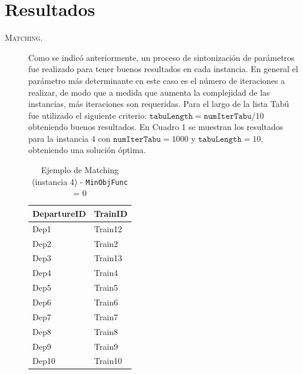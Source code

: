 \documentclass[letter, 10pt]{article}
\begin{document}

\section{Resultados}

\begin{description}
    \item[\textsc{Matching.}] Como se indicó anteriormente, un proceso de sintonización de parámetros fue realizado para tener buenos resultados en cada instancia. En general el parámetro más determinante en este caso es el número de iteraciones a realizar, de modo que a medida que aumenta la complejidad de las instancias, más iteraciones son requeridas. Para el largo de la lista Tabú fue utilizado el siguiente criterio: $\texttt{tabuLength}=\texttt{numIterTabu}/10$ obteniendo buenos resultados. En Cuadro 1 se muestran los resultados para la instancia $4$ con $\texttt{numIterTabu}=1000$ y $\texttt{tabuLength}=10$, obteniendo una solución óptima.
\begin{table}[htpb!]
\centering
\label{tab:1}
\begin{tabular}{|l|l|}
\hline
\rowcolor[HTML]{329A9D}
\textbf{DepartureID}         & \textbf{TrainID}               \\ \hline
{\color[HTML]{000000} Dep1}  & {\color[HTML]{000000} Train12} \\ \hline
{\color[HTML]{000000} Dep2}  & {\color[HTML]{000000} Train2}  \\ \hline
{\color[HTML]{000000} Dep3}  & {\color[HTML]{000000} Train13} \\ \hline
{\color[HTML]{000000} Dep4}  & {\color[HTML]{000000} Train4}  \\ \hline
{\color[HTML]{000000} Dep5}  & {\color[HTML]{000000} Train5}  \\ \hline
{\color[HTML]{000000} Dep6}  & {\color[HTML]{000000} Train6}  \\ \hline
{\color[HTML]{000000} Dep7}  & {\color[HTML]{000000} Train7}  \\ \hline
{\color[HTML]{000000} Dep8}  & {\color[HTML]{000000} Train8}  \\ \hline
{\color[HTML]{000000} Dep9}  & {\color[HTML]{000000} Train9}  \\ \hline
{\color[HTML]{000000} Dep10} & {\color[HTML]{000000} Train10} \\ \hline
\end{tabular}
\caption{Ejemplo de Matching (instancia 4) - \texttt{MinObjFunc} = 0}
\end{table}


\end{description}
\end{document}
